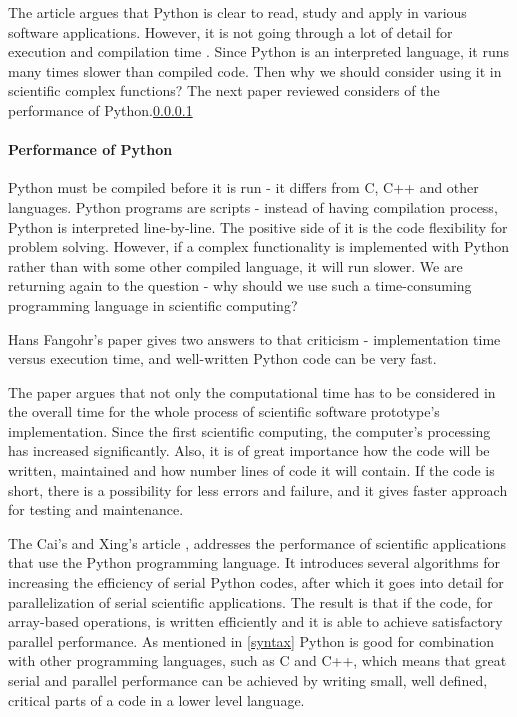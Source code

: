 The article argues that Python is clear to read, study and apply in various software applications. However, it is not going through a lot of detail for execution and compilation time \cite{HansPython}. Since Python is an interpreted language, it runs many times slower than compiled code. Then why we should consider using it in scientific complex functions? The next paper reviewed considers of the performance of Python.\ref{performance}

\vspace{2mm}
\paragraph{Performance of Python}
\label{performance}
\vspace{3mm}

Python must be compiled before it is run - it differs from C, C++ and other languages. Python programs are scripts - instead of having compilation process, Python is interpreted line-by-line. The positive side of it is the code flexibility for problem solving. However, if a complex functionality is implemented with Python rather than with some other compiled language, it will run slower. We are returning again to the question - why should we use such a time-consuming programming language in scientific computing? \cite{ScottPython}

 Hans Fangohr's paper \cite{HansPython} gives two answers to that criticism - implementation time versus execution time, and well-written Python code can be very fast.

The paper argues that not only the computational time has to be considered in the overall time for the whole process of scientific software prototype's implementation. Since the first scientific computing, the computer's processing has increased significantly. Also, it is of great importance how the code will be written, maintained and how number lines of code it will contain. If the code is short, there is a possibility for less errors and failure, and it gives faster approach for testing and maintenance. 

The Cai's and Xing's article \cite{cai2005performance}, addresses the performance of scientific applications that use the Python programming language. It introduces several algorithms for increasing the efficiency of serial Python codes, after which it goes into detail for parallelization of serial scientific applications. The result is that if the code, for array-based operations, is written efficiently and it is able to achieve satisfactory parallel performance. As mentioned in \ref{syntax} Python is good for combination with other programming languages, such as C and C++, which means that great serial and parallel performance can be achieved by writing small, well defined, critical parts of a code in a lower level language. 

